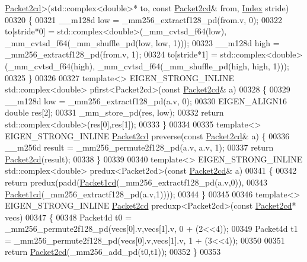 \begin{DoxyCode}
      \hyperlink{struct_eigen_1_1internal_1_1_packet2cd}{Packet2cd}>(std::complex<double>* to, \textcolor{keyword}{const} \hyperlink{struct_eigen_1_1internal_1_1_packet2cd}{Packet2cd}& from, 
      \hyperlink{namespace_eigen_a62e77e0933482dafde8fe197d9a2cfde}{Index} stride)
00320 \{
00321   \_\_m128d low = \_mm256\_extractf128\_pd(from.v, 0);
00322   to[stride*0] = std::complex<double>(\_mm\_cvtsd\_f64(low), \_mm\_cvtsd\_f64(\_mm\_shuffle\_pd(low, low, 1)));
00323   \_\_m128d high = \_mm256\_extractf128\_pd(from.v, 1);
00324   to[stride*1] = std::complex<double>(\_mm\_cvtsd\_f64(high), \_mm\_cvtsd\_f64(\_mm\_shuffle\_pd(high, high, 1)));
00325 \}
00326 
00327 \textcolor{keyword}{template}<> EIGEN\_STRONG\_INLINE std::complex<double> pfirst<Packet2cd>(\textcolor{keyword}{const} 
      \hyperlink{struct_eigen_1_1internal_1_1_packet2cd}{Packet2cd}& a)
00328 \{
00329   \_\_m128d low = \_mm256\_extractf128\_pd(a.v, 0);
00330   EIGEN\_ALIGN16 \textcolor{keywordtype}{double} res[2];
00331   \_mm\_store\_pd(res, low);
00332   \textcolor{keywordflow}{return} std::complex<double>(res[0],res[1]);
00333 \}
00334 
00335 \textcolor{keyword}{template}<> EIGEN\_STRONG\_INLINE \hyperlink{struct_eigen_1_1internal_1_1_packet2cd}{Packet2cd} preverse(\textcolor{keyword}{const} \hyperlink{struct_eigen_1_1internal_1_1_packet2cd}{Packet2cd}& a) \{
00336   \_\_m256d result = \_mm256\_permute2f128\_pd(a.v, a.v, 1);
00337   \textcolor{keywordflow}{return} \hyperlink{struct_eigen_1_1internal_1_1_packet2cd}{Packet2cd}(result);
00338 \}
00339 
00340 \textcolor{keyword}{template}<> EIGEN\_STRONG\_INLINE std::complex<double> predux<Packet2cd>(\textcolor{keyword}{const} 
      \hyperlink{struct_eigen_1_1internal_1_1_packet2cd}{Packet2cd}& a)
00341 \{
00342   \textcolor{keywordflow}{return} predux(padd(\hyperlink{struct_eigen_1_1internal_1_1_packet1cd}{Packet1cd}(\_mm256\_extractf128\_pd(a.v,0)),
00343                      \hyperlink{struct_eigen_1_1internal_1_1_packet1cd}{Packet1cd}(\_mm256\_extractf128\_pd(a.v,1))));
00344 \}
00345 
00346 \textcolor{keyword}{template}<> EIGEN\_STRONG\_INLINE \hyperlink{struct_eigen_1_1internal_1_1_packet2cd}{Packet2cd} preduxp<Packet2cd>(\textcolor{keyword}{const} 
      \hyperlink{struct_eigen_1_1internal_1_1_packet2cd}{Packet2cd}* vecs)
00347 \{
00348   Packet4d t0 = \_mm256\_permute2f128\_pd(vecs[0].v,vecs[1].v, 0 + (2<<4));
00349   Packet4d t1 = \_mm256\_permute2f128\_pd(vecs[0].v,vecs[1].v, 1 + (3<<4));
00350 
00351   \textcolor{keywordflow}{return} \hyperlink{struct_eigen_1_1internal_1_1_packet2cd}{Packet2cd}(\_mm256\_add\_pd(t0,t1));
00352 \}
00353 

\end{DoxyCode}
